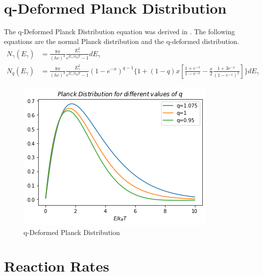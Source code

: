 \documentclass[11pt]{article}
\numberwithin{equation}{section}
\begin{document}
\section{q-Deformed Planck Distribution}
The q-Deformed Planck Distribution equation was derived in \citep{tsallis2009introduction}. The following equations are the normal Planck distribution and the q-deformed distribution.
\begin{align}
	N_{\gamma}(E_{\gamma})&=\frac{8\pi}{(hc)^{3}}\frac{E_{\gamma}^{2}}{e^{E_{\gamma}/k_{B}T}-1}dE_{\gamma}\\
	N_{q}(E_{\gamma})&=\frac{8\pi}{(hc)^{3}}\frac{E_{\gamma}^{2}}{e^{E_{\gamma}/k_{B}T}-1}(1-e^{-x})^{q-1}\Bigg\{1+(1-q)x\left[\frac{1+e^{-x}}{1-e^{-x}} - \frac{x}{2}\frac{1+3e^{-x}}{(1-e^{-x})^{2}}\right]\Bigg\}	dE_{\gamma}
\end{align}
\begin{figure}[H]
  \includegraphics[width=\linewidth]{"./Figures/plank distribution.png"}
  \caption{q-Deformed Planck Distribution}
  \label{fig:q-plank}
\end{figure}

\section{Reaction Rates}
\end{document}
